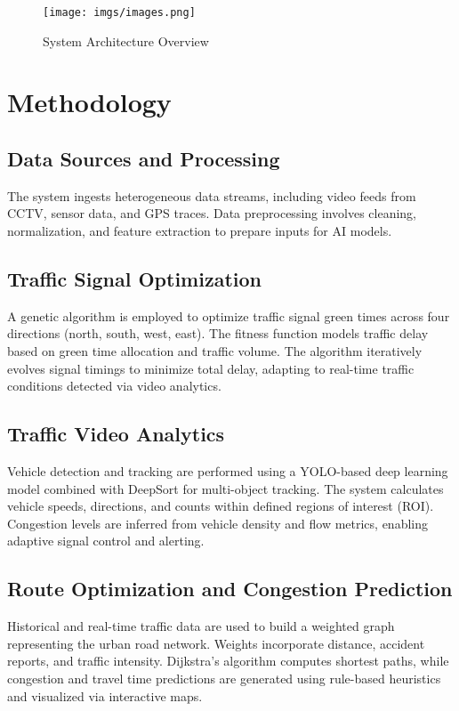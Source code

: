 \documentclass[conference]{IEEEtran}
\begin{document}
\begin{figure}[H]
    \centering
    \texttt{[image: imgs/images.png]}
    \caption{System Architecture Overview}
    \label{fig:architecture}
\end{figure}

\section{Methodology}
\subsection{Data Sources and Processing}
The system ingests heterogeneous data streams, including video feeds from CCTV, sensor data, and GPS traces. Data preprocessing involves cleaning, normalization, and feature extraction to prepare inputs for AI models.

\subsection{Traffic Signal Optimization}
A genetic algorithm is employed to optimize traffic signal green times across four directions (north, south, west, east). The fitness function models traffic delay based on green time allocation and traffic volume. The algorithm iteratively evolves signal timings to minimize total delay, adapting to real-time traffic conditions detected via video analytics.

\subsection{Traffic Video Analytics}
Vehicle detection and tracking are performed using a YOLO-based deep learning model combined with DeepSort for multi-object tracking. The system calculates vehicle speeds, directions, and counts within defined regions of interest (ROI). Congestion levels are inferred from vehicle density and flow metrics, enabling adaptive signal control and alerting.

\subsection{Route Optimization and Congestion Prediction}
Historical and real-time traffic data are used to build a weighted graph representing the urban road network. Weights incorporate distance, accident reports, and traffic intensity. Dijkstra's algorithm computes shortest paths, while congestion and travel time predictions are generated using rule-based heuristics and visualized via interactive maps.
\end{document}
